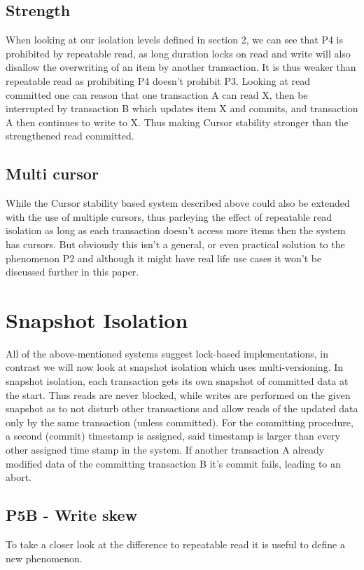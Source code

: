 \documentclass[sigconf, review=true]{acmart}
\begin{document}
\subsection{Strength}
When looking at our isolation levels defined in section 2, we can see that P4 is prohibited by repeatable read,
as long duration locks on read and write will also disallow the overwriting of an item by another transaction.
It is thus weaker than repeatable read as prohibiting P4 doesn't prohibit P3.
Looking at read committed one can reason that one transaction A can read X, then be interrupted by transaction B which updates
item X and commits, and transaction A then continues to write to X.
Thus making Cursor stability stronger than the strengthened read committed.
\subsection{Multi cursor}
While the Cursor stability based system described above could also be extended with the use of multiple cursors, thus
parleying the effect of repeatable read isolation as long as each transaction doesn't access more items
then the system has cursors. But obviously this isn't a general, or even practical solution to the phenomenon P2 and
although it might have real life use cases it won't be discussed further in this paper.
\section{Snapshot Isolation}
All of the above-mentioned systems suggest lock-based implementations, in contrast we will now look at
snapshot isolation which uses multi-versioning.
In snapshot isolation, each transaction gets its own snapshot of committed data at the start.
Thus reads are never blocked, while writes are performed on the given snapshot as to not disturb
other transactions and allow reads of the updated data only by the same transaction (unless committed).
For the committing procedure, a second (commit) timestamp is assigned, said timestamp is larger than every
other assigned time stamp in the system. If another transaction A already modified data of the committing
transaction B it's commit fails, leading to an abort.
\subsection{P5B - Write skew}
To take a closer look at the difference to repeatable read it is useful to define a new phenomenon.
\end{document}
